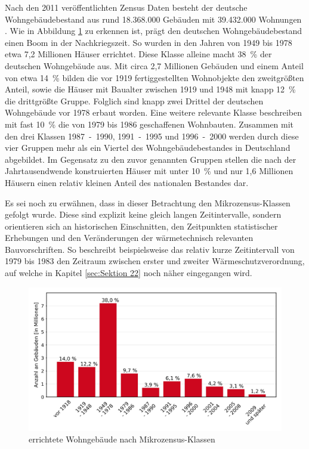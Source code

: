 Nach den 2011 veröffentlichten Zensus Daten besteht der deutsche Wohngebäudebestand aus rund 18.368.000 Gebäuden mit 39.432.000 Wohnungen \cite{.2015}.
Wie in Abbildung \ref{fig: Abbildung211} zu erkennen ist, prägt den deutschen Wohngebäudebestand einen Boom in der Nachkriegszeit. 
So wurden in den Jahren von 1949 bis 1978 etwa 7,2 Millionen Häuser errichtet. Diese Klasse alleine macht \mbox{38 \%} der deutschen Wohngebäude aus. 
Mit circa 2,7 Millionen Gebäuden und einem Anteil von etwa \mbox{14 \%} bilden die vor 1919 fertiggestellten Wohnobjekte den zweitgrößten Anteil, sowie die Häuser mit Baualter zwischen 1919 und 1948 mit knapp \mbox{12 \%} die drittgrößte Gruppe.
Folglich sind knapp zwei Drittel der deutschen Wohngebäude vor 1978 erbaut worden.
Eine weitere relevante Klasse beschreiben mit fast \mbox{10 \%} die von 1979 bis 1986 geschaffenen Wohnbauten. 
Zusammen mit den drei Klassen \mbox{1987 - 1990,} \mbox{1991 - 1995} und \mbox{1996 - 2000} werden  durch diese vier Gruppen mehr als ein Viertel des Wohngebäudebestandes in Deutschland abgebildet.
Im Gegensatz zu den zuvor genannten Gruppen stellen die nach der Jahrtausendwende konstruierten Häuser mit unter \mbox{10 \%} und nur 1,6 Millionen Häusern einen relativ kleinen Anteil des nationalen Bestandes dar. 

Es sei noch zu erwähnen, dass in dieser Betrachtung den Mikrozensus-Klassen gefolgt wurde. 
Diese sind explizit keine gleich langen Zeitintervalle, sondern \glqq orientieren sich an historischen Einschnitten, den Zeitpunkten statistischer Erhebungen und den Veränderungen der wärmetechnisch relevanten Bauvorschriften\grqq \cite{.2015}. 
So beschreibt beispielsweise das relativ kurze Zeitintervall von 1979 bis 1983 den Zeitraum zwischen erster und zweiter Wärmeschutzverordnung, auf welche in Kapitel \ref{sec:Sektion 22} noch näher eingegangen wird.

\begin{figure}[H]
	\centering
		\includegraphics{Pictures/GebaeudeAlterDiagramm.jpg}
	\caption{errichtete Wohngebäude nach Mikrozensus-Klassen  	\cite{StatistischeAmterdesBundesundderLander.2014}}
	\label{fig: Abbildung211} 
\end{figure}

